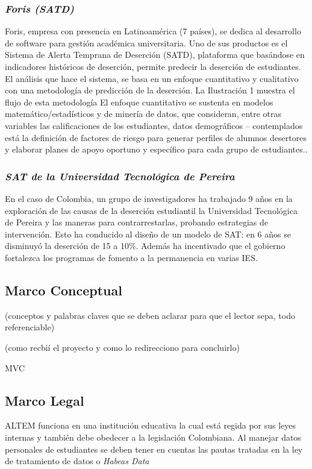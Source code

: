   \subsubsection{\textit{Foris (SATD)}}
  Foris, empresa con presencia en Latinoamérica (7 países), se dedica al desarrollo de software para gestión académica universitaria. Uno de sus productos es el Sistema de Alerta Temprana de Deserción (SATD), plataforma que basándose en indicadores históricos de deserción, permite predecir la deserción de estudiantes. El análisis que hace el sistema, se basa en un enfoque cuantitativo y cualitativo con una metodología de predicción de la deserción. La Ilustración 1 muestra el flujo de
  esta metodología
  El enfoque cuantitativo se sustenta en modelos matemático/estadísticos y de minería de datos, que consideran, entre otras variables las calificaciones de los estudiantes, datos demográficos – contemplados está la definición de factores de riesgo para generar perfiles de alumnos desertores y elaborar planes de apoyo oportuno y específico para cada grupo de estudiantes.\cite{SATPaper}.
 
   \subsubsection{\textit{SAT de la Universidad Tecnológica de Pereira}}
 En el caso de Colombia, un grupo de investigadores ha trabajado 9 años en la exploración de las causas de la deserción estudiantil la Universidad Tecnológica de Pereira y las maneras para contrarrestarlas, probando estrategias de intervención. Esto ha conducido al diseño de un modelo de SAT: en 6 años se disminuyó la deserción de 15 a 10\%. Además ha incentivado que el gobierno fortalezca los programas de fomento a la permanencia en varias IES. \cite{carvajal}
 
\subsection{Marco Conceptual}

(conceptos y palabras claves que se deben aclarar para que el lector sepa, todo referenciable)

(como recbií el proyecto y como lo redirecciono para concluirlo)

MVC 

\subsection{Marco Legal}
ALTEM funciona en una institución educativa la cual está regida por sus leyes internas y también debe obedecer a la legislación Colombiana. Al manejar datos personales de estudiantes se deben tener en cuentas las pautas tratadas en la ley de tratamiento de datos o \textit{Habeas Data}

